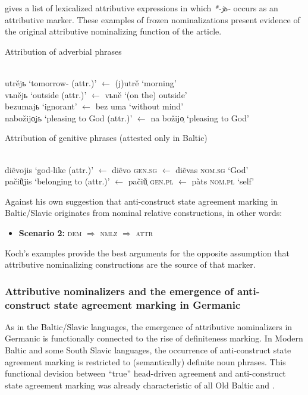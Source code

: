 \citet[467–468]{koch1999} gives a list of lexicalized attributive expressions in which \textit{*-jь-} occurs as an attributive marker. These examples of frozen nominalizations present evidence of the original attributive nominalizing function of the  article. 
\begin{exe}
\ex
\begin{xlist}
\ex \rm{Attribution of adverbial phrases}
\begin{xlist}
\ex \rm{}\\
	utrějь \rm{‘tomorrow- (attr.)’ $\leftarrow$} (j)utrě \rm{‘morning’}
\ex \rm{}\\
	vьnějь \rm{‘outside (attr.)’ $\leftarrow$} vьně \rm{‘(on the) outside’}\\
	bezumajь \rm{‘ignorant’ $\leftarrow$} bez uma \rm{‘without mind’}
\ex \rm{}\\
	nabožijo̜jь \rm{‘pleasing to God (attr.)’ $\leftarrow$} na božijo̜ \rm{‘pleasing to God’}
\end{xlist}
\ex \rm{Attribution of genitive phrases (attested only in Baltic)}
\begin{xlist}
\ex \rm{}\\
	di\~evojis \rm{‘god-like (attr.)’ $\leftarrow$} di\~evo \rm{\textsc{gen.sg} $\leftarrow$} di\~evas \rm{\textsc{nom.sg} ‘God’}
\ex \rm{}\\
	pači\~u̜jis \rm{‘belonging to (attr.)’ $\leftarrow$} pači\~u̜ \rm{\textsc{gen.pl} $\leftarrow$} pàts \rm{\textsc{nom.pl} ‘self’}
\end{xlist}
\end{xlist}
\end{exe}
Against his own suggestion that anti-construct state agreement marking in Baltic\slash{}Slavic originates from nominal relative constructions, in other words:
\begin{itemize}
\item \textbf{Scenario 2:} \textsc{dem $\Rightarrow$ nmlz $\Rightarrow$ attr}
\end{itemize}
Koch's examples provide the best arguments for the opposite assumption that attributive nominalizing constructions are the source of that marker.

\subsubsection[Germanic]{Attributive nominalizers and the emergence of anti-construct state agreement marking in Germanic} \label{germanic diachr}
As in the Baltic\slash{}Slavic languages, the emergence of attributive nominalizers in Germanic is functionally connected to the rise of definiteness marking. In Modern Baltic and some South Slavic languages, the occurrence of anti-construct state agreement marking is restricted to (semantically) definite noun phrases. This functional devision between “true” head\hyp{}driven agreement and anti-construct state agreement marking was already characteristic of all Old Baltic and . 

